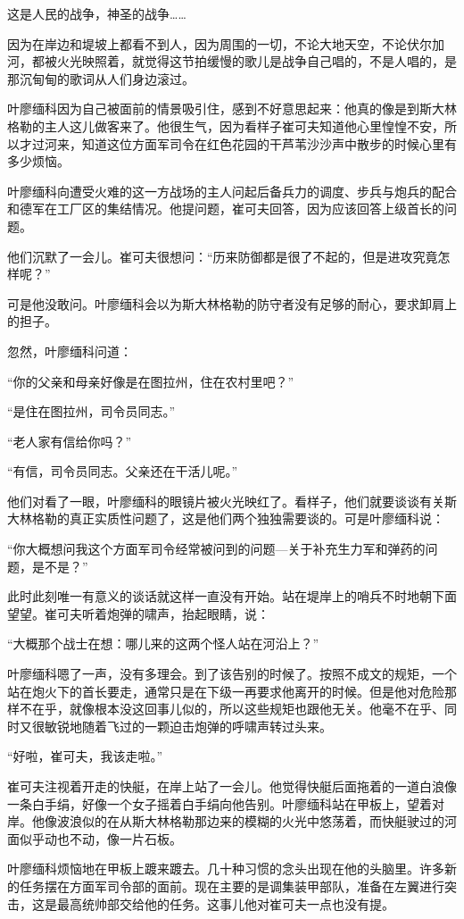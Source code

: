 这是人民的战争，神圣的战争……

因为在岸边和堤坡上都看不到人，因为周围的一切，不论大地天空，不论伏尔加河，都被火光映照着，就觉得这节拍缓慢的歌儿是战争自己唱的，不是人唱的，是那沉甸甸的歌词从人们身边滚过。

叶廖缅科因为自己被面前的情景吸引住，感到不好意思起来：他真的像是到斯大林格勒的主人这儿做客来了。他很生气，因为看样子崔可夫知道他心里惶惶不安，所以才过河来，知道这位方面军司令在红色花园的干芦苇沙沙声中散步的时候心里有多少烦恼。

叶廖缅科向遭受火难的这一方战场的主人问起后备兵力的调度、步兵与炮兵的配合和德军在工厂区的集结情况。他提问题，崔可夫回答，因为应该回答上级首长的问题。

他们沉默了一会儿。崔可夫很想问：“历来防御都是很了不起的，但是进攻究竟怎样呢？”

可是他没敢问。叶廖缅科会以为斯大林格勒的防守者没有足够的耐心，要求卸肩上的担子。

忽然，叶廖缅科问道：

“你的父亲和母亲好像是在图拉州，住在农村里吧？”

“是住在图拉州，司令员同志。”

“老人家有信给你吗？”

“有信，司令员同志。父亲还在干活儿呢。”

他们对看了一眼，叶廖缅科的眼镜片被火光映红了。看样子，他们就要谈谈有关斯大林格勒的真正实质性问题了，这是他们两个独独需要谈的。可是叶廖缅科说：

“你大概想问我这个方面军司令经常被问到的问题—关于补充生力军和弹药的问题，是不是？”

此时此刻唯一有意义的谈话就这样一直没有开始。站在堤岸上的哨兵不时地朝下面望望。崔可夫听着炮弹的啸声，抬起眼睛，说：

“大概那个战士在想：哪儿来的这两个怪人站在河沿上？”

叶廖缅科嗯了一声，没有多理会。到了该告别的时候了。按照不成文的规矩，一个站在炮火下的首长要走，通常只是在下级一再要求他离开的时候。但是他对危险那样不在乎，就像根本没这回事儿似的，所以这些规矩也跟他无关。他毫不在乎、同时又很敏锐地随着飞过的一颗迫击炮弹的呼啸声转过头来。

“好啦，崔可夫，我该走啦。”

崔可夫注视着开走的快艇，在岸上站了一会儿。他觉得快艇后面拖着的一道白浪像一条白手绢，好像一个女子摇着白手绢向他告别。叶廖缅科站在甲板上，望着对岸。他像波浪似的在从斯大林格勒那边来的模糊的火光中悠荡着，而快艇驶过的河面似乎动也不动，像一片石板。

叶廖缅科烦恼地在甲板上踱来踱去。几十种习惯的念头出现在他的头脑里。许多新的任务摆在方面军司令部的面前。现在主要的是调集装甲部队，准备在左翼进行突击，这是最高统帅部交给他的任务。这事儿他对崔可夫一点也没有提。

